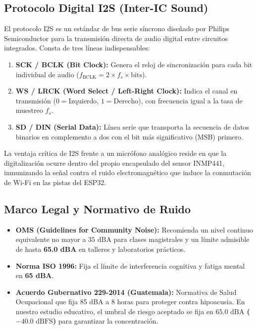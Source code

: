 \documentclass{article}
\begin{document}
\subsection{Protocolo Digital I2S (Inter-IC Sound)}
El protocolo I2S es un estándar de bus serie síncrono diseñado por Philips Semiconductor para la transmisión directa de audio digital entre circuitos integrados. Consta de tres líneas indispensables:
\begin{enumerate}
    \item \textbf{SCK / BCLK (Bit Clock):} Genera el reloj de sincronización para cada bit individual de audio ($f_{\text{BCLK}} = 2 \times f_s \times \text{bits}$).
    \item \textbf{WS / LRCK (Word Select / Left-Right Clock):} Indica el canal en transmisión ($0 = \text{Izquierdo}$, $1 = \text{Derecho}$), con frecuencia igual a la tasa de muestreo $f_s$.
    \item \textbf{SD / DIN (Serial Data):} Línea serie que transporta la secuencia de datos binarios en complemento a dos con el bit más significativo (MSB) primero.
\end{enumerate}
La ventaja crítica de I2S frente a un micrófono analógico reside en que la digitalización ocurre dentro del propio encapsulado del sensor INMP441, inmunizando la señal contra el ruido electromagnético que induce la conmutación de Wi-Fi en las pistas del ESP32.

\subsection{Marco Legal y Normativo de Ruido}
\begin{itemize}
    \item \textbf{OMS (Guidelines for Community Noise):} Recomienda un nivel continuo equivalente no mayor a $35\text{ dBA}$ para clases magistrales y un límite admisible de hasta \textbf{65.0 dBA} en talleres y laboratorios prácticos.
    \item \textbf{Norma ISO 1996:} Fija el límite de interferencia cognitiva y fatiga mental en \textbf{65 dBA}.
    \item \textbf{Acuerdo Gubernativo 229-2014 (Guatemala):} Normativa de Salud Ocupacional que fija 85 dBA a 8 horas para proteger contra hipoacusia. En nuestro estudio educativo, el umbral de riesgo aceptado se fija en \textbf{$65.0\text{ dBA}$ ($-40.0\text{ dBFS}$)} para garantizar la concentración.
\end{itemize}
\end{document}
